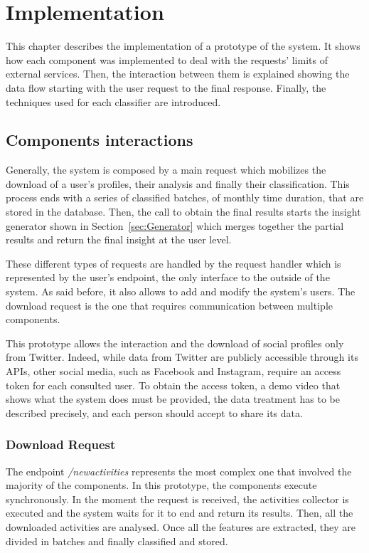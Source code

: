 \chapter{Implementation}
This chapter describes the implementation of a prototype of the system.
It shows how each component was implemented to deal with the requests' limits of external services.
Then, the interaction between them is explained showing the data flow starting with the user request to the final response.
Finally, the techniques used for each classifier are introduced.

\section{Components interactions}
Generally, the system is composed by a main request which mobilizes the download of a user's profiles, their analysis and finally their classification.
This process ends with a series of classified batches, of monthly time duration, that are stored in the database.
Then, the call to obtain the final results starts the insight generator shown in Section~\ref{sec:Generator} which merges together the partial results and return the final insight at the user level.

These different types of requests are handled by the request handler which is represented by the user's endpoint, the only interface to the outside of the system.
As said before, it also allows to add and modify the system's users.
The download request is the one that requires communication between multiple components.

This prototype allows the interaction and the download of social profiles only from Twitter.
Indeed, while data from Twitter are publicly accessible through its APIs, other social media, such as Facebook and Instagram, require an access token for each consulted user.
To obtain the access token, a demo video that shows what the system does must be provided, the data treatment has to be described precisely, and each person should accept to share its data.
\subsection{Download Request}
\label{sec:downloadRequ}
The endpoint \textit{/newactivities} represents the most complex one that involved the majority of the components.
In this prototype, the components execute synchronously. In the moment the request is received, the activities collector is executed and the system waits for it to end and return its results.
Then, all the downloaded activities are analysed. Once all the features are extracted, they are divided in batches and finally classified and stored.

